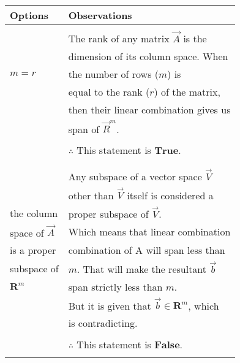 \documentclass[journal,12pt,twocolumn]{IEEEtran}
\begin{document}
	\begin{table}[hp]
		\begin{tabular}{|l|l|}
			\hline
			Options & Observations\\
			\hline
			& \\
			& The rank of any matrix $\vec{A}$ is the \\  
			& dimension of its column space. When  \\
			$m = r$&  the number of rows ($m$) is  \\
			& equal to the rank ($r$) of the matrix, \\
			&  then their linear combination gives us \\
			& span of $\vec{R}^{m}$.\\
			& \\
			& $\therefore$ This statement is $\textbf{True}$. \\
			& \\
			\hline 
			& \\
			& Any subspace of a vector space $\vec{V}$ \\ 
			& other than $\vec{V}$ itself is considered a \\
			the column & proper subspace of $\vec{V}$. \\
			space of $\vec{A}$ & Which means that linear combination\\
			is a proper & combination of A will span less than\\
			subspace of & $m$. That will make the resultant $\vec{b}$\\
			$\mathbf{R}^{m}$ & span strictly less than $m$. \\
			& But it is given that $\vec{b} \in \mathbf{R}^{m}$, which\\
			& is contradicting.\\
			& \\
			& $\therefore$ This statement is $\textbf{False}$. \\
			& \\
			\hline
		\end{tabular}
	\end{table}
	
\end{document}
